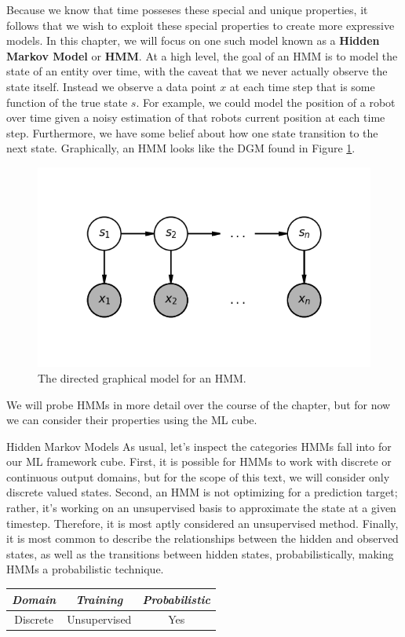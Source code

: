 Because we know that time posseses these special and unique properties, it follows that we wish to exploit these special properties to create more expressive models. In this chapter, we will focus on one such model known as a \textbf{Hidden Markov Model} or \textbf{HMM}. At a high level, the goal of an HMM is to model the state of an entity over time, with the caveat that we never actually observe the state itself. Instead we observe a data point $x$ at each time step that is some function of the true state $s$. For example, we could model the position of a robot over time given a noisy estimation of that robots current position at each time step. Furthermore, we have some belief about how one state transition to the next state. Graphically, an HMM looks like the DGM found in Figure \ref{fig:HMM-DGM}.

\begin{figure}
    \centering
    \includegraphics[width=0.5\paperwidth]{../HiddenMarkovModels/fig/HMM_DGM.png}
    \caption{The directed graphical model for an HMM.}
    \label{fig:HMM-DGM}
\end{figure}

We will probe HMMs in more detail over the course of the chapter, but for now we can consider their properties using the ML cube.

\begin{mlcube}{Hidden Markov Models}
As usual, let's inspect the categories HMMs fall into for our ML framework cube. First, it is possible for HMMs to work with discrete or continuous output domains, but for the scope of this text, we will consider only discrete valued states. Second, an HMM is not optimizing for a prediction target; rather, it's working on an unsupervised basis to approximate the state at a given timestep. Therefore, it is most aptly considered an unsupervised method. Finally, it is most common to describe the relationships between the hidden and observed states, as well as the transitions between hidden states, probabilistically, making HMMs a probabilistic technique.
\begin{center}
    \begin{tabular}{c|c|c}
    \textit{\textbf{Domain}} & \textit{\textbf{Training}} & \textit{\textbf{Probabilistic}} \\
    \hline
    Discrete & Unsupervised & Yes \\
    \end{tabular}
\end{center}
\end{mlcube}

